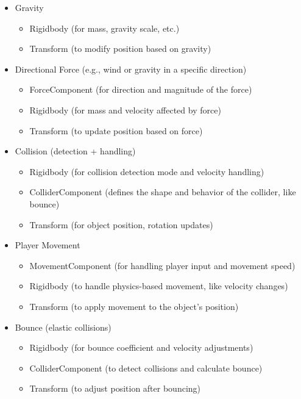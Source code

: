 \documentclass{projdoc}
\begin{document}
\begin{itemize}
    \item Gravity
    \begin{itemize}
        \item Rigidbody (for mass, gravity scale, etc.)
        \item Transform (to modify position based on gravity)
    \end{itemize}

    \item Directional Force (e.g., wind or gravity in a specific direction)
    \begin{itemize}
        \item ForceComponent (for direction and magnitude of the force)
        \item Rigidbody (for mass and velocity affected by force)
        \item Transform (to update position based on force)
    \end{itemize}

    \item Collision (detection + handling)
    \begin{itemize}
        \item Rigidbody (for collision detection mode and velocity handling)
        \item ColliderComponent (defines the shape and behavior of the collider, like bounce)
        \item Transform (for object position, rotation updates)
    \end{itemize}

    \item Player Movement
    \begin{itemize}
        \item MovementComponent (for handling player input and movement speed)
        \item Rigidbody (to handle physics-based movement, like velocity changes)
        \item Transform (to apply movement to the object's position)
    \end{itemize}

    \item Bounce (elastic collisions)
    \begin{itemize}
        \item Rigidbody (for bounce coefficient and velocity adjustments)
        \item ColliderComponent (to detect collisions and calculate bounce)
        \item Transform (to adjust position after bouncing)
    \end{itemize}


\end{itemize}
\end{document}
